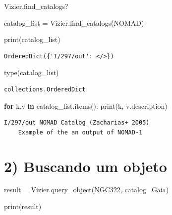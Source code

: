 \documentclass[
  letterpaper,
  DIV=11,
  numbers=noendperiod]{scrreprt}
\newenvironment{Shaded}{\begin{snugshade}}{\end{snugshade}}
\newcommand{\BuiltInTok}[1]{\textcolor[rgb]{0.00,0.23,0.31}{#1}}
\newcommand{\ControlFlowTok}[1]{\textcolor[rgb]{0.00,0.23,0.31}{\textbf{#1}}}
\newcommand{\KeywordTok}[1]{\textcolor[rgb]{0.00,0.23,0.31}{\textbf{#1}}}
\newcommand{\NormalTok}[1]{\textcolor[rgb]{0.00,0.23,0.31}{#1}}
\newcommand{\OperatorTok}[1]{\textcolor[rgb]{0.37,0.37,0.37}{#1}}
\newcommand{\StringTok}[1]{\textcolor[rgb]{0.13,0.47,0.30}{#1}}
\begin{document}
\begin{Shaded}
\begin{Highlighting}[]
\NormalTok{Vizier.find\_catalogs?}
\end{Highlighting}
\end{Shaded}

\begin{Shaded}
\begin{Highlighting}[]
\NormalTok{catalog\_list }\OperatorTok{=}\NormalTok{ Vizier.find\_catalogs(}\StringTok{\textquotesingle{}NOMAD\textquotesingle{}}\NormalTok{)}

\BuiltInTok{print}\NormalTok{(catalog\_list)}
\end{Highlighting}
\end{Shaded}

\begin{verbatim}
OrderedDict({'I/297/out': </>})
\end{verbatim}

\begin{Shaded}
\begin{Highlighting}[]
\BuiltInTok{type}\NormalTok{(catalog\_list)}
\end{Highlighting}
\end{Shaded}

\begin{verbatim}
collections.OrderedDict
\end{verbatim}

\begin{Shaded}
\begin{Highlighting}[]
\ControlFlowTok{for}\NormalTok{ k,v }\KeywordTok{in}\NormalTok{ catalog\_list.items():}
    \BuiltInTok{print}\NormalTok{(k, v.description)}
\end{Highlighting}
\end{Shaded}

\begin{verbatim}
I/297/out NOMAD Catalog (Zacharias+ 2005)
    Example of the an output of NOMAD-1
\end{verbatim}

\section{2) Buscando um objeto}\label{buscando-um-objeto}

\begin{Shaded}
\begin{Highlighting}[]
\NormalTok{result }\OperatorTok{=}\NormalTok{ Vizier.query\_object(}\StringTok{\textquotesingle{}NGC322\textquotesingle{}}\NormalTok{, catalog}\OperatorTok{=}\StringTok{\textquotesingle{}Gaia\textquotesingle{}}\NormalTok{)}

\BuiltInTok{print}\NormalTok{(result)}
\end{Highlighting}
\end{Shaded}
\end{document}
